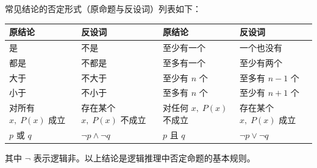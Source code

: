 \begin{statementbox}
常见结论的否定形式（原命题与反设词）列表如下：

\begin{center}
\small
\begin{tabularx}{\linewidth}{|X|X|X|X|}
\hline
\textbf{原结论} & \textbf{反设词} & \textbf{原结论} & \textbf{反设词} \\
\hline
是 & 不是 & 至少有一个 & 一个也没有 \\
\hline
都是 & 不都是 & 至多有一个 & 至少有两个 \\
\hline
大于 & 不大于 & 至少有 \(n\) 个 & 至多有 \(n-1\) 个 \\
\hline
小于 & 不小于 & 至多有 \(n\) 个 & 至少有 \(n+1\) 个 \\
\hline
对所有 \(x,\;P(x)\) 成立 & 存在某个 \(x,\;P(x)\) 不成立 & 对任何 \(x,\;P(x)\) 不成立 & 存在某个 \(x,\;P(x)\) 成立 \\
\hline
\(p\) 或 \(q\) & \(\lnot p \land \lnot q\) & \(p\) 且 \(q\) & \(\lnot p \lor \lnot q\) \\
\hline
\end{tabularx}
\end{center}

其中 \(\lnot\) 表示逻辑非。以上结论是逻辑推理中否定命题的基本规则。
\end{statementbox}